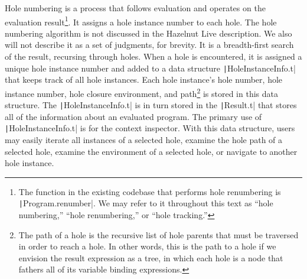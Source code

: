 Hole numbering is a process that follows evaluation and operates on the evaluation result\footnote{The function in the existing codebase that performs hole renumbering is \texttt|Program.renumber|. We may refer to it throughout this text as ``hole numbering,'' ``hole renumbering,'' or ``hole tracking.''}. It assigns a hole instance number to each hole. The hole numbering algorithm is not discussed in the Hazelnut Live description. We also will not describe it as a set of judgments, for brevity. It is a breadth-first search of the result, recursing through holes. When a hole is encountered, it is assigned a unique hole instance number and added to a data structure \texttt|HoleInstanceInfo.t| that keeps track of all hole instances. Each hole instance's hole number, hole instance number, hole closure environment, and path\footnote{The path of a hole is the recursive list of hole parents that must be traversed in order to reach a hole. In other words, this is the path to a hole if we envision the result expression as a tree, in which each hole is a node that fathers all of its variable binding expressions.} is stored in this data structure. The \texttt|HoleInstanceInfo.t| is in turn stored in the \texttt|Result.t| that stores all of the information about an evaluated program. The primary use of \texttt|HoleInstanceInfo.t| is for the context inspector. With this data structure, users may easily iterate all instances of a selected hole, examine the hole path of a selected hole, examine the environment of a selected hole, or navigate to another hole instance.

%         
%         

